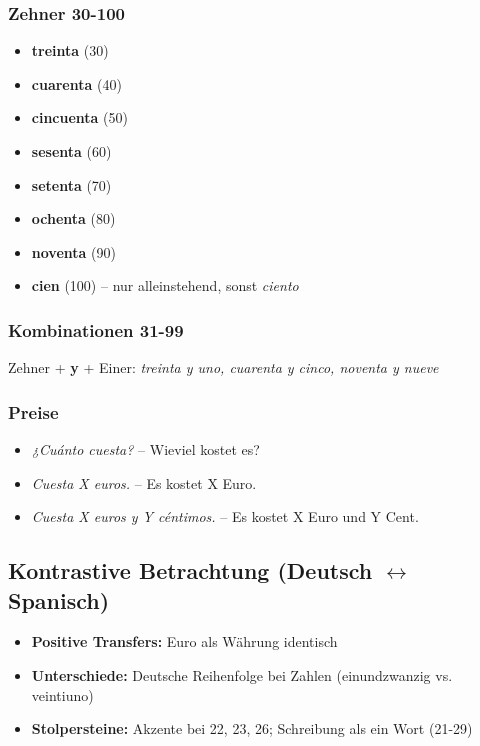 \documentclass[11pt,a4paper]{article}
\begin{document}
\subsubsection{Zehner 30-100}
\begin{itemize}
    \item \textbf{treinta} (30)
    \item \textbf{cuarenta} (40)
    \item \textbf{cincuenta} (50)
    \item \textbf{sesenta} (60)
    \item \textbf{setenta} (70)
    \item \textbf{ochenta} (80)
    \item \textbf{noventa} (90)
    \item \textbf{cien} (100) -- nur alleinstehend, sonst \textit{ciento}
\end{itemize}

\subsubsection{Kombinationen 31-99}
Zehner + \textbf{y} + Einer: \textit{treinta y uno, cuarenta y cinco, noventa y nueve}

\subsubsection{Preise}
\begin{itemize}
    \item \textit{¿Cuánto cuesta?} -- Wieviel kostet es?
    \item \textit{Cuesta X euros.} -- Es kostet X Euro.
    \item \textit{Cuesta X euros y Y céntimos.} -- Es kostet X Euro und Y Cent.
\end{itemize}

\subsection{Kontrastive Betrachtung (Deutsch $\leftrightarrow$ Spanisch)}
\begin{itemize}
    \item \textbf{Positive Transfers:} Euro als Währung identisch
    \item \textbf{Unterschiede:} Deutsche Reihenfolge bei Zahlen (einundzwanzig vs. veintiuno)
    \item \textbf{Stolpersteine:} Akzente bei 22, 23, 26; Schreibung als ein Wort (21-29)
\end{itemize}
\end{document}
